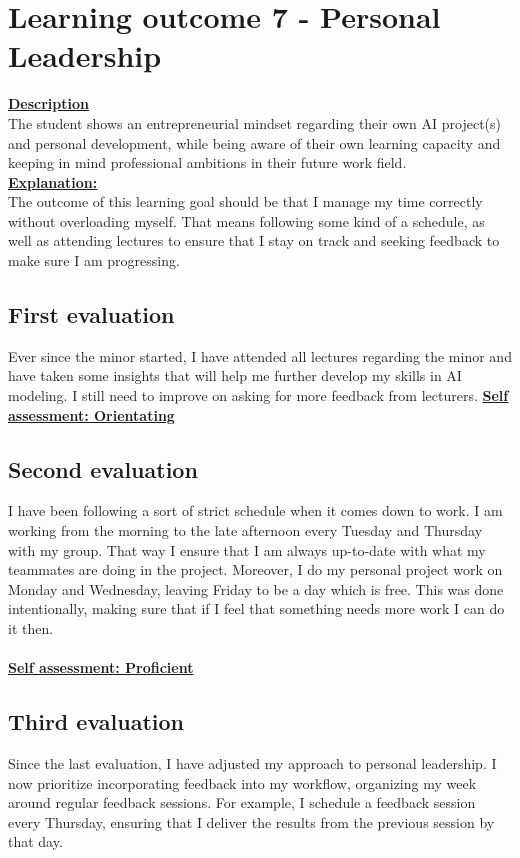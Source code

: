\documentclass{article}
\begin{document}
\section{Learning outcome 7 - Personal Leadership}
\underline{\textbf{Description}}\\
The student shows an entrepreneurial mindset regarding their own AI project(s) and personal development, while being aware
of their own learning capacity and keeping in mind professional ambitions in their future work field.\\
\underline{\textbf{Explanation:}}\\
The outcome of this learning goal should be that I manage my time correctly without overloading myself. That means following some kind of a schedule, 
as well as attending lectures to ensure that I stay on track and seeking feedback to make sure I am progressing.

\subsection{First evaluation}
Ever since the minor started, I have attended all lectures regarding the minor and have taken some insights that will help me further develop my skills in AI modeling. 
I still need to improve on asking for more feedback from lecturers.
\underline{\textbf{Self assessment: Orientating}}

\subsection{Second evaluation}
I have been following a sort of strict schedule when it comes down to work. I am working from the morning to the late afternoon every Tuesday and Thursday
with my group. That way I ensure that I am always up-to-date with what my teammates are doing in the project. Moreover, I do my personal project work on Monday and Wednesday, leaving 
Friday to be a day which is free. This was done intentionally, making sure that if I feel that something needs more work I can do it then. \\\\
\underline{\textbf{Self assessment: Proficient}}
\subsection{Third evaluation}
Since the last evaluation, I have adjusted my approach to personal leadership. I now prioritize incorporating feedback into my workflow, organizing my week around regular feedback sessions. For example, I schedule a feedback session every Thursday, ensuring that I deliver the results from the previous session by that day.
\end{document}
